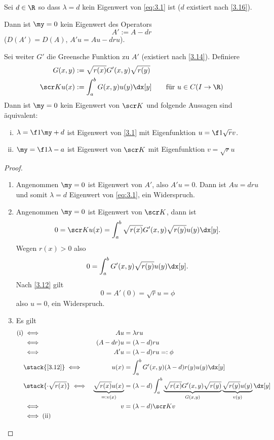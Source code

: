 \begin{st} \label{3.17}
	Sei $d\in \R$ so dass $\lambda = d$ kein Eigenwert von \eqref{eq:3.1} ist ($d$ existiert nach \ref{3.16}).

	Dann ist $\my = 0$ kein Eigenwert des Operators
	\[
		A' := A - dr
	\]
	($D(A') = D(A)$, $A'u = Au - dru$).

	Sei weiter $G'$ die Greensche Funktion zu $A'$ (existiert nach \ref{3.14}).
	Definiere
	\begin{align*}
		G(x,y) &:= \sqrt {r(x)} G'(x,y) \sqrt{r(y)} \\
		\scr K u(x) &:= \int_a^b G(x,y) u(y) \dx[y]  \qquad \text{für $u\in C(I\to \R)$}
	\end{align*}
	Dann ist $\my = 0$ kein Eigenwert von $\scr K$ und folgende Aussagen sind äquivalent:
	\begin{enumerate}[(i)]
		\item
			$\lambda = \f 1\my + d$ ist Eigenwert von \eqref{3.1} mit Eigenfunktion $u=\f 1{\sqrt r} v$.
		\item
			$\my = \f 1{\lambda -a}$ ist Eigenwert von $\scr K$ mit Eigenfunktion $v = \sqrt{r} u$
	\end{enumerate}
	\begin{proof}
		\begin{enumerate}[1)]
			\item
				Angenommen $\my = 0$ ist Eigenwert von $A'$, also $A'u = 0$.
				Dann ist $Au = dru$ und somit $\lambda = d$ Eigenwert von \eqref{eq:3.1}, ein Widerspruch.
			\item
				Angenommen $\my = 0$ ist Eigenwert von $\scr K$, dann ist
				\begin{align*}
					0 = \scr K u(x) = \int_a^b \sqrt{r(x)} G'(x,y) \sqrt{r(y)} u(y) \dx[y].
				\end{align*}
				Wegen $r(x) > 0$ also
				\begin{align*}
					0 = \int_a^b G'(x,y) \sqrt{r(y)} u(y) \dx[y].
				\end{align*}
				Nach \ref{3.12} gilt 
				\[
					0 = A'(0) = \sqrt{r} u = \phi
				\]
				also $u = 0$, ein Widerspruch.
			\item
				Es gilt
				\begin{alignat*}{2}
					\text{(i)} &\iff& Au &= \lambda ru \\
					&\iff& (A-dr)u &= (\lambda - d)ru \\
					&\iff& A' u &= (\lambda -d)ru =: \phi \\
					&\stack{\ref{3.12}}\iff& u(x) &= \int_a^b G'(x,y) (\lambda -d) r(y) u(y) \dx[y] \\
					&\stack{\cdot \sqrt{r(x)}}\iff& \underbrace{\sqrt{r(x)} u(x)}_{=:v(x)} &= (\lambda - d) \int_a^b \underbrace{\sqrt{r(x)} G'(x,y) \sqrt{r(y)}}_{G(x,y)} \underbrace{\sqrt{r(y)} u(y)}_{v(y)} \dx[y] \\
					&\iff& v &= (\lambda -d) \scr K v \\
					&\iff \text{(ii)}&&
				\end{alignat*}
		\end{enumerate}
	\end{proof}
\end{st}

